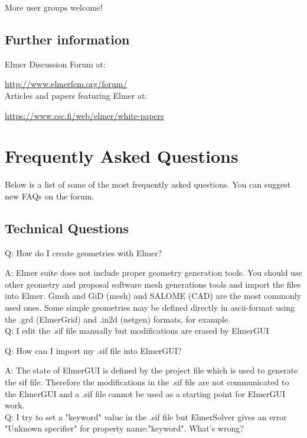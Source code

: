 \noindent More user groups welcome!

\subsection{Further information}

\noindent Elmer Discussion Forum at:

\url{http://www.elmerfem.org/forum/}\\

\noindent Articles and papers featuring Elmer at:

\url{https://www.csc.fi/web/elmer/white-papers}\\

\section{Frequently Asked Questions}

Below is a list of some of the most frequently asked questions. You can suggest new FAQs on the forum.

\subsection{Technical Questions}

    Q: How do I create geometries with Elmer?

    A: Elmer suite does not include proper geometry generation tools. You should use other geometry and proposal software mesh generations tools and import the files into Elmer. Gmsh and GiD (mesh) and SALOME (CAD) are the most commonly used ones. Some simple geometries may be defined directly in ascii-format using the .grd (ElmerGrid) and .in2d (netgen) formats, for example.\\

    Q: I edit the .sif file manually but modifications are erased by ElmerGUI

    Q: How can I import my .sif file into ElmerGUI?

    A: The state of ElmerGUI is defined by the project file which is used to generate the sif file. Therefore the modifications in the .sif file are not communicated to the ElmerGUI and a .sif file cannot be used as a starting point for ElmerGUI work.\\

    Q: I try to set a "keyword" value in the .sif file but ElmerSolver gives an error "Unknown specifier" for property name:"keyword". What's wrong?


